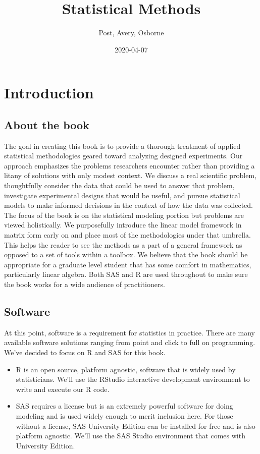 \documentclass[
]{book}
\title{Statistical Methods}
\author{Post, Avery, Osborne}
\date{2020-04-07}
\theoremstyle{definition}
\theoremstyle{definition}
\theoremstyle{definition}
\theoremstyle{remark}
\begin{document}
\maketitle

{
\setcounter{tocdepth}{1}
\tableofcontents
}
\hypertarget{introduction}{%
\chapter{Introduction}\label{introduction}}

\hypertarget{about-the-book}{%
\section{About the book}\label{about-the-book}}

The goal in creating this book is to provide a thorough treatment of applied statistical methodologies geared toward analyzing designed experiments. Our approach emphasizes the problems researchers encounter rather than providing a litany of solutions with only modest context. We discuss a real scientific problem, thoughtfully consider the data that could be used to answer that problem, investigate experimental designs that would be useful, and pursue statistical models to make informed decisions in the context of how the data was collected. The focus of the book is on the statistical modeling portion but problems are viewed holistically. We purposefully introduce the linear model framework in matrix form early on and place most of the methodologies under that umbrella. This helps the reader to see the methods as a part of a general framework as opposed to a set of tools within a toolbox. We believe that the book should be appropriate for a graduate level student that has some comfort in mathematics, particularly linear algebra. Both SAS and R are used throughout to make sure the book works for a wide audience of practitioners.

\hypertarget{software}{%
\section{Software}\label{software}}

At this point, software is a requirement for statistics in practice. There are many available software solutions ranging from point and click to full on programming. We've decided to focus on R and SAS for this book.

\begin{itemize}
\item
  R is an open source, platform agnostic, software that is widely used by statisticians. We'll use the RStudio interactive development environment to write and execute our R code.
\item
  SAS requires a license but is an extremely powerful software for doing modeling and is used widely enough to merit inclusion here. For those without a license, SAS University Edition can be installed for free and is also platform agnostic. We'll use the SAS Studio environment that comes with University Edition.
\end{itemize}
\end{document}
